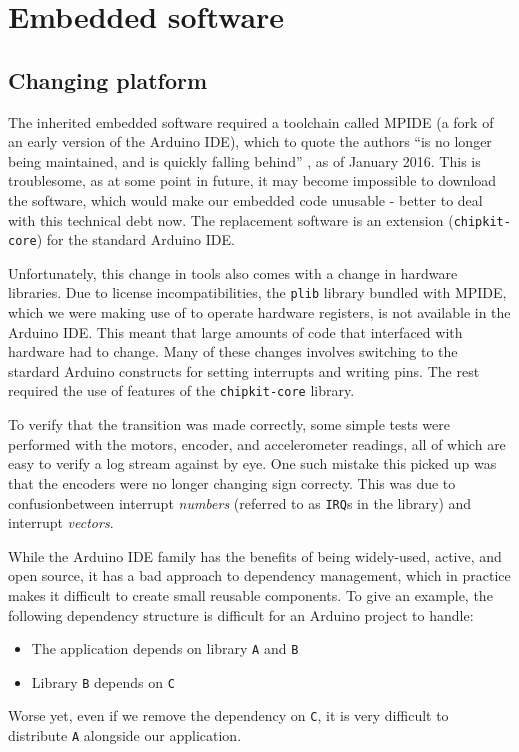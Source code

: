 \documentclass[main.tex]{subfiles}
\begin{document}
\section{Embedded software}

\subsection{Changing platform}

	The inherited embedded software required a toolchain called MPIDE (a fork of an early version of the Arduino IDE), which to quote the authors \enquote{is no longer being maintained, and is quickly falling behind} \cite{mpide}, as of January 2016. This is troublesome, as at some point in future, it may become impossible to download the software, which would make our embedded code unusable - better to deal with this technical debt now. The replacement software is an extension (\texttt{chipkit-core}) for the standard Arduino IDE.

	Unfortunately, this change in tools also comes with a change in hardware libraries.
	Due to license incompatibilities, the \texttt{plib} library bundled with MPIDE, which we were making use of to operate hardware registers, is not available in the Arduino IDE.
	This meant that large amounts of code that interfaced with hardware had to change. Many of these changes involves switching to the stardard Arduino constructs for setting interrupts and writing pins.
	The rest required the use of features of the \texttt{chipkit-core} library.

	To verify that the transition was made correctly, some simple tests were performed with the motors, encoder, and accelerometer readings, all of which are easy to verify a log stream against by eye. One such mistake this picked up was that the encoders were no longer changing sign correcty.
	This was due to confusion\footnotemark between interrupt \emph{numbers} (referred to as \texttt{IRQ}s in the library) and interrupt \emph{vectors}.


	While the Arduino IDE family has the benefits of being widely-used, active, and open source, it has a bad approach to dependency management, which in practice makes it difficult to create small reusable components.
	To give an example, the following dependency structure is difficult for an Arduino project to handle:
	\begin{itemize}
		\item The application depends on library \texttt{A} and \texttt{B}
		\item Library \texttt{B} depends on \texttt{C}
	\end{itemize}
	Worse yet, even if we remove the dependency on \texttt{C}, it is very difficult to distribute \texttt{A} alongside our application.
\end{document}
